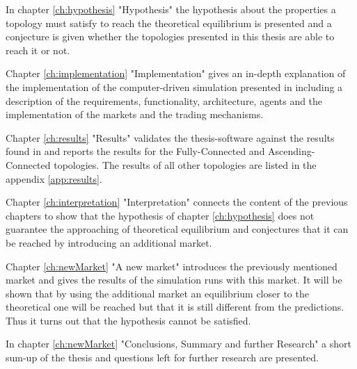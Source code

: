 \documentclass[Bachelorarbeit.tex]{subfiles}
\begin{document}
\bigskip

In chapter \ref{ch:hypothesis} "Hypothesis" the hypothesis about the properties a topology must satisfy to reach the theoretical equilibrium is presented and a conjecture is given whether the topologies presented in this thesis are able to reach it or not.

\bigskip

Chapter \ref{ch:implementation} "Implementation" gives an in-depth explanation of the implementation of the computer-driven simulation presented in \cite{Breuer2015} including a description of the requirements, functionality, architecture, agents and the implementation of the markets and the trading mechanisms.

\bigskip

Chapter \ref{ch:results} "Results" validates the thesis-software against the results found in \cite{Breuer2015} and reports the results for the Fully-Connected and Ascending-Connected topologies. The results of all other topologies are listed in the appendix \ref{app:results}.

\bigskip

Chapter \ref{ch:interpretation} "Interpretation" connects the content of the previous chapters to show that the hypothesis of chapter \ref{ch:hypothesis} does not guarantee the approaching of theoretical equilibrium and conjectures that it can be reached by introducing an additional market.

\bigskip

Chapter \ref{ch:newMarket} "A new market" introduces the previously mentioned market and gives the results of the simulation runs with this market. It will be shown that by using the additional market an equilibrium closer to the theoretical one will be reached but that it is still different from the predictions. Thus it turns out that the hypothesis cannot be satisfied.

\bigskip

In chapter \ref{ch:newMarket} "Conclusions, Summary and further Research" a short sum-up of the thesis and questions left for further research are presented.
\end{document}
